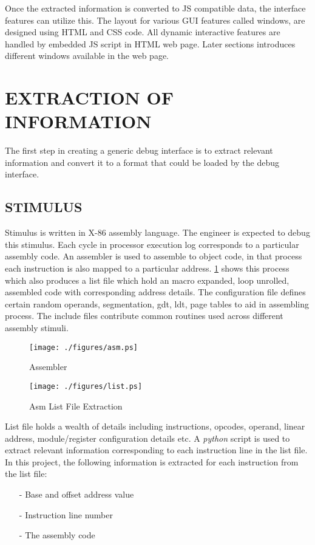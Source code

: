 Once the extracted information is converted to JS compatible data, the interface features can utilize this. The layout for various GUI features called windows, are designed using HTML and CSS code. All dynamic interactive features are handled by embedded JS script in HTML web page. Later sections introduces different windows available in the web page.

\section {EXTRACTION OF INFORMATION}
The first step in creating a generic debug interface is to extract relevant information and convert it to a format that could be loaded by the debug interface.

\subsection {STIMULUS}
Stimulus is written in X-86 assembly language. The engineer is expected to debug this stimulus. Each cycle in processor execution log corresponds to a particular assembly code. An assembler is used to assemble to object code, in that process each instruction is also mapped to a particular address. \figurename{\ref{impl.tex:assembler}} shows this process which also produces a list file which hold an macro expanded, loop unrolled, assembled code with corresponding address details. The configuration file defines certain random operands, segmentation, gdt, ldt, page tables to aid in assembling process. The include files contribute common routines used across different assembly stimuli.


\begin{figure}[h]
\centering
\texttt{[image: ./figures/asm.ps]}
\caption{Assembler}
\label{impl.tex:assembler}
\end{figure}


\begin{figure}[h]
\centering
\texttt{[image: ./figures/list.ps]}
\caption{Asm List File Extraction}
\label{impl.tex:listextr}
\end{figure}

List file holds a wealth of details including instructions, opcodes, operand, linear address, module/register configuration details etc. A {\it python} script is used to extract relevant information corresponding to each instruction line in the list file. In this project, the following information is extracted for each instruction from the  list file:
\begin{itemize}
	\item[-] Base and offset address value
	\item[-] Instruction line number
	\item[-] The assembly code
\end{itemize}

